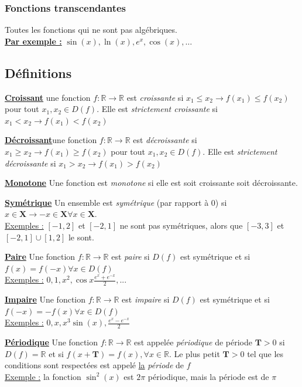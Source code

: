 \documentclass[12pt,a4paper]{article}
\newcommand{\evid}[1]{\textbf{\underline{#1}}}
\newcommand{\X}{\ensuremath{\mathbf{X}}}
\newcommand{\R}{\ensuremath{\mathbb{R}} }
\newcommand{\rtor}{\ensuremath{\R \to \R} }
\begin{document}
{\subsubsection{Fonctions transcendantes}
Toutes les fonctions qui ne sont pas algébriques.\\
\evid{Par exemple :} $\sin(x), \ln(x), e^x, \cos(x), \ldots$

\subsection{Définitions}
\begin{boite}
\evid{Croissant} une fonction $f:\rtor$ est \textit{croissante} si $x_1 \leq x_2 \to f(x_1) \leq f(x_2)$ pour tout $x_1,x_2 \in D(f)$. Elle est \textit{strictement croissante} si $x_1 < x_2 \to f(x_1) < f(x_2)$ 
\end{boite}
\begin{boite}
\evid{Décroissant}une fonction $f:\rtor$ est \textit{décroissante} si $x_1 \geq x_2 \to f(x_1) \geq f(x_2)$ pour tout $x_1,x_2 \in D(f)$. Elle est \textit{strictement décroissante} si $x_1 > x_2 \to f(x_1) > f(x_2)$ 
\end{boite}
\begin{boite}
\evid{Monotone} Une fonction est \textit{monotone} si elle est soit croissante soit décroissante.
\end{boite}
\begin{boite}
\evid{Symétrique} Un ensemble est \textit{symétrique} (par rapport à 0) si $x \in \X \to -x \in \X \forall x \in \X$.\\
\underline{Exemples :} $[-1,2]$ et $[-2,1]$ ne sont pas symétriques, alors que $[-3,3]$ et $[-2,1]\cup[1,2]$ le sont.
\end{boite}
\begin{boite}
\evid{Paire} Une fonction $f:\rtor$ est \textit{paire} si $D(f)$ est symétrique et si $f(x) = f(-x) \forall x \in D(f)$\\
\underline{Exemples :}	$0,1,x^2, \cos{x}\frac{e^x+e^{-x}}{2},...$
\end{boite}
\begin{boite}
\evid{Impaire} Une fonction $f:\rtor$ est \textit{impaire} si $D(f)$ est symétrique et si $f(-x) =-f(x) \forall x \in D(f)$\\
\underline{Exemples :} $0,x,x^3\sin(x), \frac{e^x-e^{-x}}{2} $
\end{boite}
\begin{boite}
\evid{Périodique} Une fonction $f:\rtor$ est appelée \textit{périodique} de période $\mathbf{T} > 0$ si$D(f) = \R$ et si $f(x+\mathbf{T}) = f(x), \forall x \in \R$. Le plus petit $\mathbf{T} > 0$ tel que les conditions sont respectées est appelé \underline{la} \textit{période} de $f$\\
\underline{Exemple :} la fonction $\sin^2(x)$ est $2\pi$ périodique, mais la période est de $\pi$
\end{boite}
}
\end{document}
